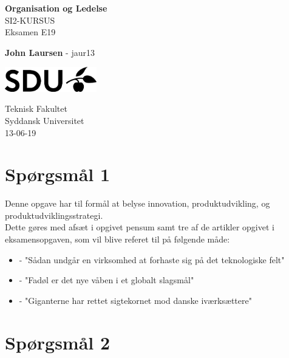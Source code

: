\documentclass{article}
\begin{document}
\begin{titlepage}
    \begin{center}
        \vspace*{1cm}
        
        {\huge \textbf{Organisation og Ledelse}}
        \\SI2-KURSUS
        \\\vspace{0.5cm}
        Eksamen E19
        
        \vspace{1.5cm}
        
        \textbf{John Laursen} - jaur13 \\
        
        
        \vspace{15cm}
        
        \hspace*{1.9cm}
        \includegraphics[width=0.3\textwidth]{assets/SDU_BLACK_RGB.png}
        
        Teknisk Fakultet \\
        Syddansk Universitet\\
        13-06-19
    \end{center}
\end{titlepage}
\tableofcontents
\newpage
\section{Spørgsmål 1}
Denne opgave har til formål at belyse innovation, produktudvikling, og produktudviklingsstrategi.\\
Dette gøres med afsæt i opgivet pensum samt tre af de artikler opgivet i eksamensopgaven, som vil blive
referet til på følgende måde:
\begin{itemize}
    \item \cite[a.1]{eksamensopgave} - "Sådan undgår en virksomhed at forhaste sig på det teknologiske felt"
    \item \cite[a.2]{eksamensopgave} - "Fadøl er det nye våben i et globalt slagsmål"
    \item \cite[a.3]{eksamensopgave} - "Giganterne har rettet sigtekornet mod danske iværksættere"
\end{itemize}



\clearpage
\section{Spørgsmål 2}

\newpage
\printbibliography[title = {Kilder}]
\end{document}
